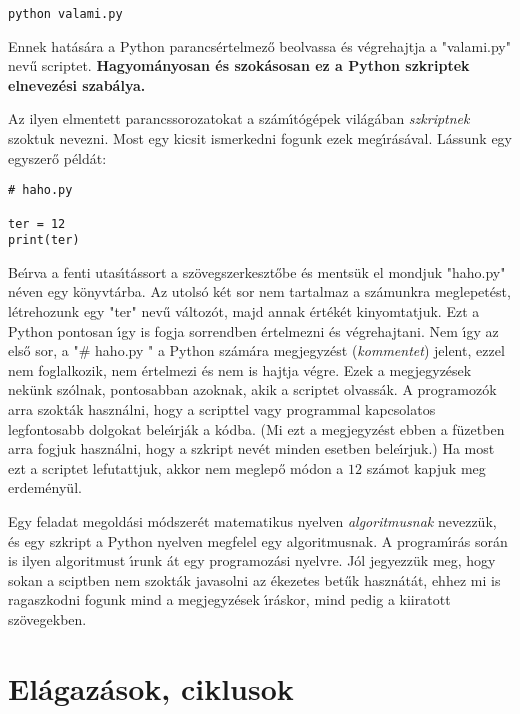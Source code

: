 \documentclass[12pt]{article}
\newcounter{feladat}
\newcounter{megold}
\begin{document}
\begin{Verbatim}[fontsize=\small]
python valami.py
\end{Verbatim}

Ennek hat\'as\'ara a Python parancs\'ertelmez\H{o} beolvassa \'es v\'egrehajtja a "valami.py" nev\H{u} 
scriptet. {\bf Hagyom\'anyosan \'es szok\'asosan ez a Python szkriptek elnevez\'esi szab\'alya.} 

Az ilyen elmentett parancssorozatokat a sz\'am\'{\i}t\'og\'epek vil\'ag\'aban {\sl szkriptnek}  
szoktuk nevezni. Most egy kicsit ismerkedni fogunk ezek meg\'{\i}r\'as\'aval. L\'assunk egy 
egyszer\H{o} p\'eld\'at:

\begin{Verbatim}[fontsize=\small]
# haho.py

ter = 12
print(ter)
\end{Verbatim}

Be\'{\i}rva a fenti utas\'{\i}t\'assort a sz\"ovegszerkeszt\H{o}be \'es ments\"uk el mondjuk 
"haho.py" n\'even egy k\"onyvt\'arba. Az utols\'o k\'et sor nem tartalmaz a sz\'amunkra meglepet\'est, 
l\'etrehozunk egy "ter" nev\H{u} v\'altoz\'ot, majd annak \'ert\'ek\'et kinyomtatjuk. Ezt a Python 
pontosan \'{\i}gy is fogja sorrendben \'ertelmezni \'es v\'egrehajtani. Nem \'{\i}gy az els\H{o} sor, a 
"$\#$ haho.py " a Python sz\'am\'ara megjegyz\'est ({\sl kommentet})  jelent, ezzel nem 
foglalkozik, nem 
\'ertelmezi \'es nem is hajtja v\'egre. Ezek a megjegyz\'esek nek\"unk sz\'olnak, pontosabban azoknak, 
akik a scriptet olvass\'ak. A programoz\'ok arra szokt\'ak haszn\'alni, hogy a scripttel vagy programmal 
kapcsolatos legfontosabb dolgokat bele\'{\i}rj\'ak a k\'odba. (Mi ezt a megjegyz\'est ebben a f\"uzetben 
arra fogjuk haszn\'alni, hogy a szkript nev\'et minden esetben bele\'{\i}rjuk.) Ha most ezt a scriptet 
lefutattjuk, akkor nem meglep\H{o} m\'odon a $12$ sz\'amot kapjuk meg erdem\'eny\"ul. 

Egy feladat megold\'asi m\'odszer\'et matematikus nyelven {\sl algoritmusnak} nevezz\"uk,  
\'es egy 
szkript a Python nyelven megfelel egy algoritmusnak. A program\'{\i}r\'as sor\'an is ilyen algoritmust 
\'{\i}runk \'at egy programoz\'asi nyelvre. J\'ol jegyezz\"uk meg, hogy sokan a sciptben nem szokt\'ak javasolni 
az \'ekezetes bet\H{u}k haszn\'at\'at, ehhez mi is ragaszkodni fogunk mind a megjegyz\'esek \'{\i}r\'askor, 
mind pedig a kiiratott sz\"ovegekben.

\section{El\'agaz\'asok, ciklusok}
\end{document}
